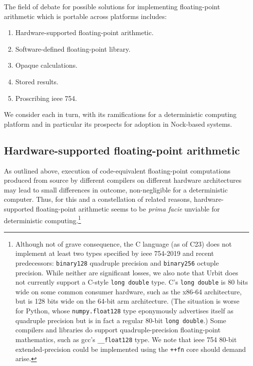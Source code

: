 \documentclass[twoside]{article}
\begin{document}
The field of debate for possible solutions for implementing floating-point arithmetic which is portable across platforms includes:

\begin{enumerate}
  \item  Hardware-supported floating-point arithmetic.
  \item  Software-defined floating-point library.
  \item  Opaque calculations.
  \item  Stored results.
  \item  Proscribing {\sc ieee} 754.
\end{enumerate}

We consider each in turn, with its ramifications for a deterministic computing platform and in particular its prospects for adoption in Nock-based systems.

\subsection{Hardware-supported floating-point arithmetic}

As outlined above, execution of code-equivalent floating-point computations produced from source by different compilers on different hardware architectures may lead to small differences in outcome, non-negligible for a deterministic computer.  Thus, for this and a constellation of related reasons, hardware-supported floating-point arithmetic seems to be \emph{prima facie} unviable for deterministic computing.\footnote{Although not of grave consequence, the C language (as of C23) does not implement at least two types specified by {\sc ieee} 754-2019 and recent predecessors:  \texttt{binary128} quadruple precision and \texttt{binary256} octuple precision.  While neither are significant losses, we also note that Urbit does not currently support a C-style \texttt{long double} type.  C's \texttt{long double} is 80 bits wide on some common consumer hardware, such as the x86-64 architecture, but is 128 bits wide on the 64-bit {\sc arm} architecture.  (The situation is worse for Python, whose \texttt{numpy.float128} type eponymously advertises itself as quadruple precision but is in fact a regular 80-bit \texttt{long double}.)  Some compilers and libraries do support quadruple-precision floating-point mathematics, such as {\sc gcc}'s \texttt{\_\_float128} type.  We note that {\sc ieee} 754 80-bit extended-precision could be implemented using the \lstinline[style=inlinecode]{++fn} core should demand arise.}
\end{document}
